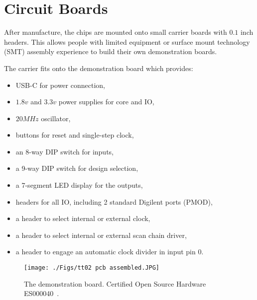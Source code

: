 \section{Circuit Boards}
\label{sec:circuit_board}
After manufacture, the chips are mounted onto small carrier boards with \(0.1\) inch headers. This allows people with limited equipment or surface mount technology (SMT) assembly experience to build their own demonstration boards.

The carrier fits onto the demonstration board which provides:
\begin{itemize}
\item USB-C for power connection,
\item \(1.8v\) and \(3.3v\) power supplies for core and IO,
\item \(20MHz\) oscillator,
\item buttons for reset and single-step clock,
\item an 8-way DIP switch for inputs,
\item a 9-way DIP switch for design selection,
\item a 7-segment LED display for the outputs,
\item headers for all IO, including 2 standard Digilent ports (PMOD),
\item a header to select internal or external clock,
\item a header to select internal or external scan chain driver,
\item a header to engage an automatic clock divider in input pin 0.
\end{itemize}

\begin{figure}[htp]
\centering
\texttt{[image: ./Figs/tt02 pcb assembled.JPG]}
\caption{The demonstration board. Certified Open Source Hardware ES000040~\cite{oshwacertification}.}
\label{fig:demonstration_board}
\end{figure}
